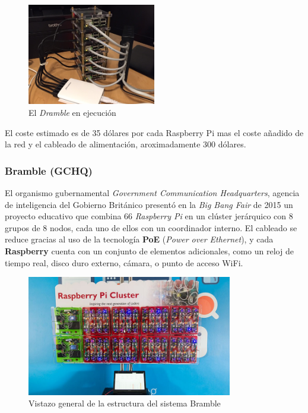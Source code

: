 \begin{figure}[H]
	\centering
	\includegraphics[width=0.5\textwidth]{Chapters/Chapter1/Figures/raspberry-pi-dramble-cluster-wired.jpg}
	\caption[Dramble]{El \textit{Dramble} en ejecución}
	\label{geerling:dramble}
\end{figure}

El coste estimado es de 35 dólares por cada Raspberry Pi mas el coste añadido de la red y el cableado de alimentación, aroximadamente 300 dólares.

\subsubsection{Bramble (GCHQ)}

El organismo gubernamental \textit{Government Communication Headquarters}, agencia de inteligencia del Gobierno Británico presentó en la \textit{Big Bang Fair} de 2015 un proyecto educativo que combina 66 \textit{Raspberry Pi} en un clúster jerárquico con 8 grupos de 8 nodos, cada uno de ellos con un coordinador interno. El cableado se reduce gracias al uso de la tecnología \textbf{PoE} (\textit{Power over Ethernet}), y cada \textbf{Raspberry} cuenta con un conjunto de elementos adicionales, como un reloj de tiempo real, disco duro externo, cámara, o punto de acceso WiFi\cite{gchqbramble}.

\begin{figure}[H]
\centering
\includegraphics[width=0.8\textwidth]{Chapters/Chapter1/Figures/bramblegchq}
\caption[Bramble]{Vistazo general de la estructura del sistema Bramble}
\label{gchq:bramble}
\end{figure}

